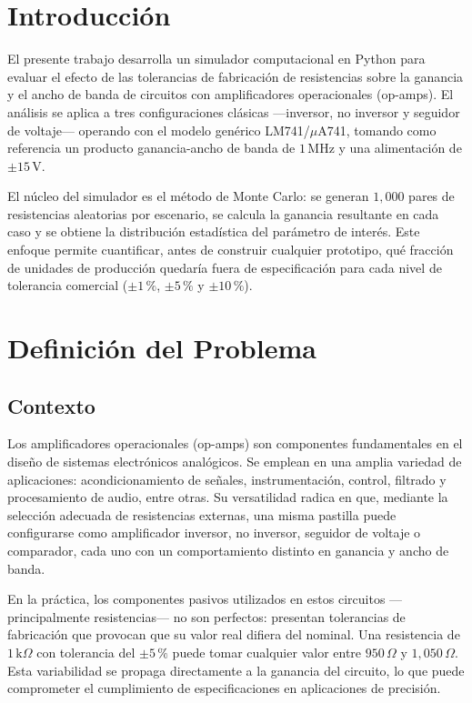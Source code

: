 ﻿\documentclass[12pt, letterpaper]{article}
\begin{document}
\section{Introducción}

El presente trabajo desarrolla un simulador computacional en Python para
evaluar el efecto de las tolerancias de fabricación de resistencias sobre la
ganancia y el ancho de banda de circuitos con amplificadores operacionales
(op-amps). El análisis se aplica a tres configuraciones clásicas —inversor,
no inversor y seguidor de voltaje— operando con el modelo genérico
LM741/\(\mu\)A741, %
tomando como referencia un producto ganancia-ancho de banda de
\(1\,\text{MHz}\) y una alimentación de \(\pm 15\,\text{V}\).

El núcleo del simulador es el método de Monte Carlo: se generan
\(1{,}000\) pares de resistencias aleatorias por escenario, se calcula la
ganancia resultante en cada caso y se obtiene la distribución estadística
del parámetro de interés. Este enfoque permite cuantificar, antes de
construir cualquier prototipo, qué fracción de unidades de producción
quedaría fuera de especificación para cada nivel de tolerancia comercial
(\(\pm 1\,\text{\%}\), \(\pm 5\,\text{\%}\) y \(\pm 10\,\text{\%}\)).



\section{Definición del Problema}

\subsection{Contexto}

Los amplificadores operacionales (op-amps) son componentes fundamentales en el
diseño de sistemas electrónicos analógicos. Se emplean en una amplia variedad de
aplicaciones: acondicionamiento de señales, instrumentación, control, filtrado y
procesamiento de audio, entre otras. Su versatilidad radica en que, mediante la
selección adecuada de resistencias externas, una misma pastilla puede configurarse
como amplificador inversor, no inversor, seguidor de voltaje o comparador, cada
uno con un comportamiento distinto en ganancia y ancho de banda.

En la práctica, los componentes pasivos utilizados en estos circuitos —principalmente
resistencias— no son perfectos: presentan tolerancias de fabricación que provocan
que su valor real difiera del nominal. Una resistencia de \(1\,\text{k}\Omega\) con %
tolerancia del \(\pm5\,\text{\%}\) puede tomar cualquier valor entre \(950\,\Omega\) y %
\(1{,}050\,\Omega\). Esta variabilidad se propaga directamente a la ganancia del %
circuito, lo que puede comprometer el cumplimiento de especificaciones en aplicaciones
de precisión.
\end{document}
